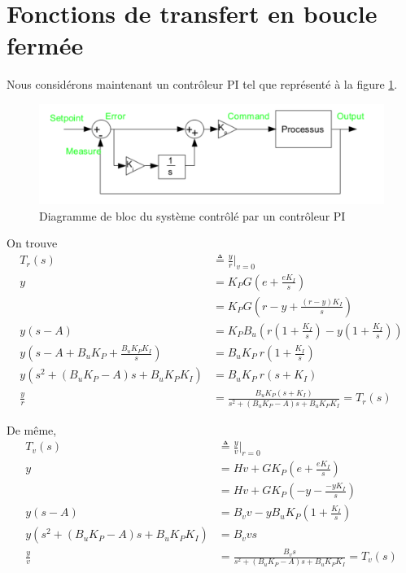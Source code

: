 \documentclass[frenchb, paper=a4, fontsize=11pt]{scrartcl}
\numberwithin{equation}{section}					%
\numberwithin{figure}{section}					%
\numberwithin{table}{section}						%
\begin{document}
\section{Fonctions de transfert en boucle fermée}

Nous considérons maintenant un contrôleur PI tel que représenté à la figure \ref{fig:closed_loop}.

\begin{figure}[!ht]
	\centering
	\includegraphics[width=\linewidth]{img/closed_loop.png}
	\caption{Diagramme de bloc du système contrôlé par un contrôleur PI}
	\label{fig:closed_loop}
\end{figure}


On trouve
\begin{align}
T_r(s) & \triangleq \frac{y}{r}\rvert_{v=0}\\
y &= K_P G \left(e+\frac{eK_I}{s} \right)\\
& = K_P G\left(r-y+\frac{(r-y)K_I}{s} \right)\\
y(s-A) & = K_P B_u\left( r(1+\frac{K_I}{s}) - y(1+\frac{K_I}{s})\right)\\
y(s-A + B_uK_P + \frac{B_uK_P K_I}{s}) & = B_uK_P  \ r \left(1+\frac{K_I}{s} \right) \\
y(s^2 +(B_uK_P-A)s + B_uK_P K_I) & = B_uK_P  \ r \left(s+K_I \right) \\
\frac{y}{r}&= \frac{B_uK_P  (s+K_I )}{s^2 +(B_uK_P-A)s + B_u K_P K_I} = T_r(s)
\end{align}

De même,
\begin{align}
T_v(s) & \triangleq \frac{y}{v}\rvert_{r=0}\\
y &= H v+ G K_P (e+\frac{eK_I}{s})\\
&= H v + G K_P(-y-\frac{-yK_I}{s}) \\
y(s-A) &= B_v v - y B_u K_P (1+\frac{K_I}{s})\\
y(s^2 + (B_u K_P-A)s + B_u K_P K_I) &= B_v v s\\
\frac{y}{v} & = \frac{B_v s}{s^2 + (B_u K_P-A)s + B_u K_P K_I} = T_v(s)
\end{align}
\end{document}
